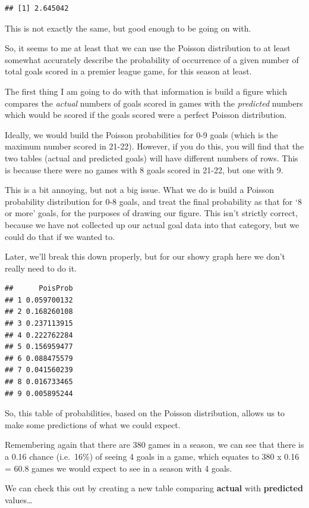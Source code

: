 \documentclass[
]{book}
\begin{document}
\begin{verbatim}
## [1] 2.645042
\end{verbatim}

This is not exactly the same, but good enough to be going on with.

So, it seems to me at least that we can use the Poisson distribution to at least somewhat accurately describe the probability of occurrence of a given number of total goals scored in a premier league game, for this season at least.

The first thing I am going to do with that information is build a figure which compares the \emph{actual} numbers of goals scored in games with the \emph{predicted} numbers which would be scored if the goals scored were a perfect Poisson distribution.

Ideally, we would build the Poisson probabilities for 0-9 goals (which is the maximum number scored in 21-22). However, if you do this, you will find that the two tables (actual and predicted goals) will have different numbers of rows. This is because there were no games with 8 goals scored in 21-22, but one with 9.

This is a bit annoying, but not a big issue. What we do is build a Poisson probability distribution for 0-8 goals, and treat the final probability as that for `8 or more' goals, for the purposes of drawing our figure. This isn't strictly correct, because we have not collected up our actual goal data into that category, but we could do that if we wanted to.

Later, we'll break this down properly, but for our showy graph here we don't really need to do it.

\begin{verbatim}
##      PoisProb
## 1 0.059700132
## 2 0.168260108
## 3 0.237113915
## 4 0.222762284
## 5 0.156959477
## 6 0.088475579
## 7 0.041560239
## 8 0.016733465
## 9 0.005895244
\end{verbatim}

So, this table of probabilities, based on the Poisson distribution, allows us to make some predictions of what we could expect.

Remembering again that there are 380 games in a season, we can see that there is a 0.16 chance (i.e.~16\%) of seeing 4 goals in a game, which equates to 380 x 0.16 = 60.8 games we would expect to see in a season with 4 goals.

We can check this out by creating a new table comparing \textbf{actual} with \textbf{predicted} values\ldots{}
\end{document}
